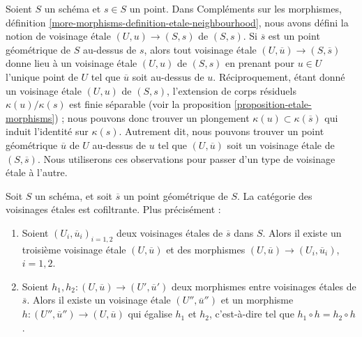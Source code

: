 \begin{remark}
\label{remark-etale-neighbourhoods}
Soient $S$ un sch\'ema et $s \in S$ un point. Dans
Compléments sur les morphismes,
définition \ref{more-morphisms-definition-etale-neighbourhood},
nous avons d\'efini la notion de voisinage \'etale $(U, u) \to (S, s)$
de $(S, s)$. Si $\overline{s}$ est un point g\'eom\'etrique de $S$ au-dessus de
$s$, alors tout voisinage \'etale $(U, \overline{u}) \to (S, \overline{s})$
donne lieu \`a un voisinage \'etale $(U, u)$ de $(S, s)$ en prenant pour
$u \in U$ l'unique point de $U$ tel que $\overline{u}$
soit au-dessus de $u$. R\'eciproquement, \'etant donn\'e un voisinage \'etale $(U, u)$
de $(S, s)$, l'extension de corps r\'esiduels $\kappa(u)/\kappa(s)$
est finie s\'eparable (voir la
proposition \ref{proposition-etale-morphisms}) ;
nous pouvons donc trouver un plongement $\kappa(u) \subset \kappa(\overline{s})$
qui induit l'identit\'e sur $\kappa(s)$. Autrement dit, nous pouvons trouver un point g\'eom\'etrique
$\overline{u}$ de $U$ au-dessus de $u$ tel que $(U, \overline{u})$
soit un voisinage \'etale de $(S, \overline{s})$.
Nous utiliserons ces observations pour passer d'un type de
voisinage \'etale \`a l'autre.
\end{remark}

\begin{lemma}
\label{lemma-cofinal-etale}
Soit $S$ un sch\'ema, et soit $\overline{s}$ un point g\'eom\'etrique de $S$.
La cat\'egorie des voisinages \'etales est cofiltrante. Plus pr\'ecis\'ement :
\begin{enumerate}
\item Soient $(U_i, \overline{u}_i)_{i = 1, 2}$ deux voisinages \'etales de
$\overline{s}$ dans $S$. Alors il existe un troisi\`eme voisinage \'etale
$(U, \overline{u})$ et des morphismes
$(U, \overline{u}) \to (U_i, \overline{u}_i)$, $i = 1, 2$.
\item Soient $h_1, h_2: (U, \overline{u}) \to (U', \overline{u}')$ deux
morphismes entre voisinages \'etales de $\overline{s}$. Alors il existe un
voisinage \'etale $(U'', \overline{u}'')$ et un morphisme
$h : (U'', \overline{u}'') \to (U, \overline{u})$
qui \'egalise $h_1$ et $h_2$, c'est-\`a-dire tel que
$h_1 \circ h = h_2 \circ h$.
\end{enumerate}
\end{lemma}

